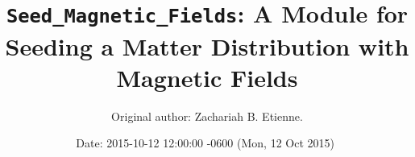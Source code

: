\documentclass{article}
\begin{document}
\title{{\tt Seed\_Magnetic\_Fields}: A Module for Seeding a Matter Distribution with Magnetic Fields}

\author{Original author: Zachariah B. Etienne. }

\date{$ $Date: 2015-10-12 12:00:00 -0600 (Mon, 12 Oct 2015) $ $}
\maketitle

%
%  
%                                                    
\end{document}
